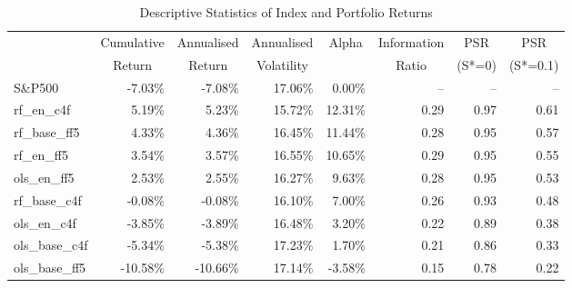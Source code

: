 \begin{table}[ht]
\centering
\caption{Descriptive Statistics of Index and Portfolio Returns}
\label{tab:return_stats_1}
\begin{tabular}{lrrrrrrr}
\toprule
{} & \multicolumn{1}{c}{Cumulative} & \multicolumn{1}{c}{Annualised} & \multicolumn{1}{c}{Annualised} & \multicolumn{1}{c}{Alpha} & \multicolumn{1}{c}{Information} & \multicolumn{1}{c}{PSR} & \multicolumn{1}{c}{PSR} \\
{} & \multicolumn{1}{c}{Return} & \multicolumn{1}{c}{Return} & \multicolumn{1}{c}{Volatility} & {} & \multicolumn{1}{c}{Ratio} & \multicolumn{1}{c}{(S*=0)} & \multicolumn{1}{c}{(S*=0.1)} \\
\midrule
S\&P500 & -7.03\% & -7.08\% & 17.06\% & 0.00\% & -- & -- & -- \\
rf\_en\_c4f & 5.19\% & 5.23\% & 15.72\% & 12.31\% & 0.29 & 0.97 & 0.61 \\
rf\_base\_ff5 & 4.33\% & 4.36\% & 16.45\% & 11.44\% & 0.28 & 0.95 & 0.57 \\
rf\_en\_ff5 & 3.54\% & 3.57\% & 16.55\% & 10.65\% & 0.29 & 0.95 & 0.55 \\
ols\_en\_ff5 & 2.53\% & 2.55\% & 16.27\% & 9.63\% & 0.28 & 0.95 & 0.53 \\
rf\_base\_c4f & -0.08\% & -0.08\% & 16.10\% & 7.00\% & 0.26 & 0.93 & 0.48 \\
ols\_en\_c4f & -3.85\% & -3.89\% & 16.48\% & 3.20\% & 0.22 & 0.89 & 0.38 \\
ols\_base\_c4f & -5.34\% & -5.38\% & 17.23\% & 1.70\% & 0.21 & 0.86 & 0.33 \\
ols\_base\_ff5 & -10.58\% & -10.66\% & 17.14\% & -3.58\% & 0.15 & 0.78 & 0.22 \\
\bottomrule
\end{tabular}
\end{table}



